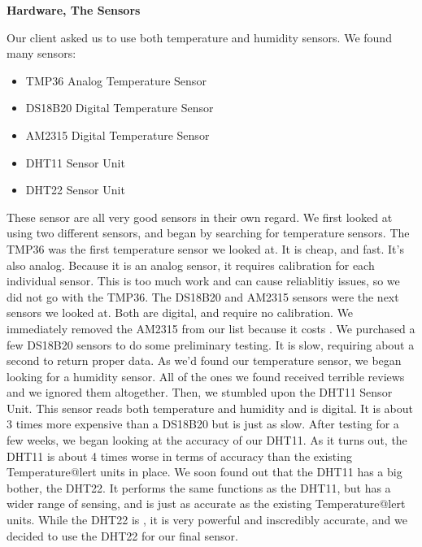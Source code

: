 \documentclass{report}
\begin{document}
\begin{center}
	\textbf{Hardware, The Sensors}
\end{center}
\indent
\indent
Our client asked us to use both temperature and humidity sensors. We found many sensors:
\begin{itemize}
	\item TMP36 Analog Temperature Sensor
	\item DS18B20 Digital Temperature Sensor
	\item AM2315 Digital Temperature Sensor
	\item DHT11 Sensor Unit
	\item DHT22 Sensor Unit
\end{itemize}
\indent
These sensor are all very good sensors in their own regard. We first looked at using two different sensors, and began by searching for temperature sensors.
\newline
\indent
The TMP36 was the first temperature sensor we looked at. It is cheap, and fast. It's also analog. Because it is an analog sensor, it requires calibration for each individual sensor. This is too much work and can cause reliablitiy issues, so we did not go with the TMP36.
\newline
\indent
The DS18B20 and AM2315 sensors were the next sensors we looked at. Both are digital, and require no calibration. We immediately removed the AM2315 from our list because it costs . We purchased a few DS18B20 sensors to do some preliminary testing. It is slow, requiring about a second to return proper data.
\newline
\indent
As we'd found our temperature sensor, we began looking for a humidity sensor. All of the ones we found received terrible reviews and we ignored them altogether. Then, we stumbled upon the DHT11 Sensor Unit. This sensor reads both temperature and humidity and is digital. It is about 3 times more expensive than a DS18B20 but is just as slow.
\newline
\indent
After testing for a few weeks, we began looking at the accuracy of our DHT11. As it turns out, the DHT11 is about 4 times worse in terms of accuracy than the existing  Temperature@lert units in place. We soon found out that the DHT11 has a big bother, the DHT22. It performs the same functions as the DHT11, but has a wider range of sensing, and is just as accurate as the existing Temperature@lert units. While the DHT22 is , it is very powerful and inscredibly accurate, and we decided to use the DHT22 for our final sensor.
\newpage
\end{document}
